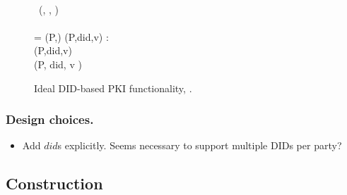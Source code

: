 \begin{figure}
\begin{framed}
\begin{minipage}[t]{0.55\textwidth}
{         \\
        ~(, \sid, \args)~~\adv \\
        ~~~\adv \\
        \pcif \sid = (P,\ssid) \land (P,did,v) \in \DID: \\
        \pcind \DID \gets \DID \setminus \lbrace (P,did,v) \rbrace~\cup \\
        \hspace*{7em} \lbrace (P, did, v \cup \args) \rbrace
      }
    \end{minipage}
    \begin{minipage}[t]{0.5\textwidth}
    \end{minipage}
  \end{framed}
  \caption{Ideal DID-based PKI functionality, \IdealFPKIDID.}
  \label{fig:fpkidid}
\end{figure}

\subsubsection{Design choices.} %

\begin{itemize}
\item Add $did$s explicitly. Seems necessary to support multiple DIDs per party?
\end{itemize}
\subsection{\RealPKIDIDAtala Construction}

